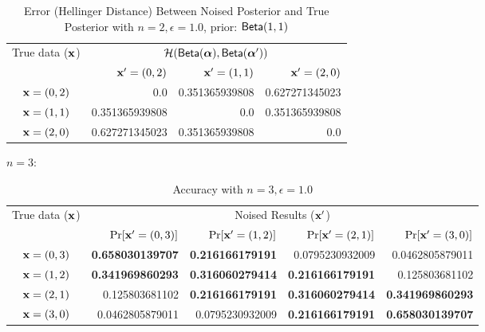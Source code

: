 \documentclass{article}
\begin{document}
\begin{table}[htbp]
\vspace{-1.0cm}
	\centering
	\caption{Error (Hellinger Distance) Between Noised Posterior and True Posterior with $n = 2, \epsilon = 1.0$, prior: $\mathsf{Beta}(1,1)$}
	\label{tab_n2error}
\begin{tabular}{|c||r|r|r|}
	\hline

	\multirow{2}{*}{True data ($\textbf{x}$)}
								& \multicolumn{3}{c|}{$\mathcal{H}(\mathsf{Beta}(\boldsymbol{\alpha}), \mathsf{Beta}(\boldsymbol{\alpha}'))$}
								\\ \cline{2-4}
	                      		& $\textbf{x}' = (0, 2)$
	                      		& $\textbf{x}' = (1, 1)$
	                      		& $\textbf{x}' = (2, 0)$
	                      		\\  \hline \hline
	$\textbf{x} = (0,2)$          & 0.0	
								& 0.351365939808
								& 0.627271345023 
								\\  \hline
	$\textbf{x} = (1,1)$          & 0.351365939808	
								& 0.0			
								& 0.351365939808
								\\  \hline
	$\textbf{x} = (2,0)$          & 0.627271345023
								& 0.351365939808 			
								& 0.0
								\\  \hline
\end{tabular}
\end{table}



\newpage
$n = 3:$
\begin{table}[htbp]
	\vspace{-0.5cm}

	\footnotesize
	\centering
	\caption{Accuracy with $n = 3, \epsilon = 1.0$}
	\label{tab_n3eps1.0prob}
\begin{tabular}{|c||r|r|r|r|}
	\hline
	\multirow{2}{*}{True data ($\textbf{x}$)}
								& \multicolumn{4}{c|}{Noised Results ($\textbf{x}'$)}  
								\\ \cline{2-5}
	                      		&  $\Pr[\textbf{x}' = (0, 3)]$  	
	                      		&  $\Pr[\textbf{x}' = (1, 2)]$ 	
	                      		&  $\Pr[\textbf{x}' = (2, 1)]$ 	
	                      		&  $\Pr[\textbf{x}' = (3, 0)]$ 	
	                      		\\  \hline
	                      		\hline
	$\textbf{x} = (0,3)$          & {\bf 0.658030139707}	
								& {\bf 0.216166179191}	
								&  0.0795230932009
								&  0.0462805879011
								\\  \hline
	$\textbf{x} = (1,2)$          & {\bf 0.341969860293}	
								& {\bf 0.316060279414}			
								& {\bf 0.216166179191}
								&  0.125803681102
								\\  \hline
	$\textbf{x} = (2,1)$          & 0.125803681102
								& {\bf 0.216166179191}			
								& {\bf 0.316060279414}
								& {\bf 0.341969860293} 
								\\  \hline
	$\textbf{x} = (3,0)$          & 0.0462805879011
								& 0.0795230932009 			
								& {\bf 0.216166179191}
								& {\bf 0.658030139707} 
								\\  \hline
\end{tabular}
\end{table}
\end{document}

